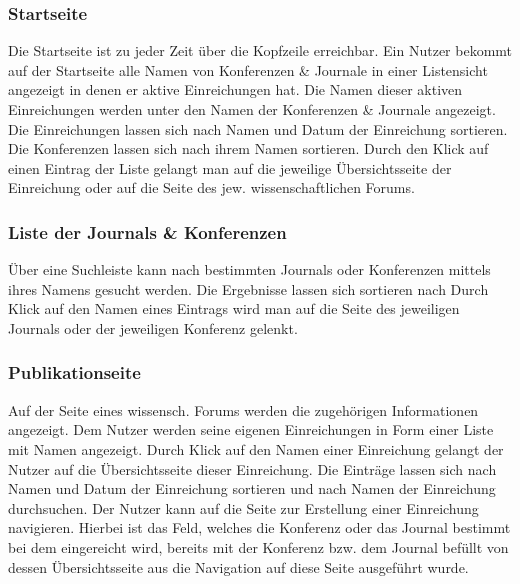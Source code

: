 \subsubsection{Startseite}
\begin{description}
    \XXitem{} Die Startseite ist zu jeder Zeit über die Kopfzeile erreichbar.
     Ein Nutzer bekommt auf der Startseite alle Namen von Konferenzen
    \& Journale in einer Listensicht angezeigt in denen er aktive Einreichungen hat.
    Die Namen dieser aktiven Einreichungen werden unter den Namen der Konferenzen \& Journale angezeigt.
     Die Einreichungen lassen sich nach Namen und Datum
    der Einreichung sortieren. Die Konferenzen lassen sich nach ihrem Namen sortieren.
    \XXitem{} Durch den Klick auf einen Eintrag der Liste gelangt man auf die jeweilige Übersichtsseite
    der Einreichung oder auf die Seite des jew. wissenschaftlichen Forums.
\end{description}

\subsubsection{Liste der Journals \& Konferenzen}
\begin{description}
     Über eine Suchleiste kann nach bestimmten Journals oder Konferenzen mittels
    ihres Namens gesucht werden.
     Die Ergebnisse lassen sich sortieren nach %
     Durch Klick auf den Namen eines Eintrags wird man auf die Seite des
    jeweiligen Journals oder der jeweiligen Konferenz gelenkt.
\end{description}

\subsubsection{Publikationseite}
\begin{description}
     Auf der Seite eines wissensch. Forums werden die zugehörigen Informationen
    angezeigt. %
     Dem Nutzer werden seine eigenen Einreichungen in Form einer Liste mit Namen angezeigt.
     Durch Klick auf den Namen einer Einreichung gelangt der Nutzer auf die Übersichtsseite
    dieser Einreichung.
     Die Einträge lassen sich nach Namen und Datum
    der Einreichung sortieren und nach Namen der Einreichung durchsuchen. %
    \XXitem{} Der Nutzer kann auf die Seite zur Erstellung einer Einreichung navigieren. Hierbei ist
    das Feld, welches die Konferenz oder das Journal bestimmt bei dem eingereicht wird, bereits mit
    der Konferenz bzw. dem Journal befüllt von dessen Übersichtsseite aus die Navigation auf diese
    Seite ausgeführt wurde.
\end{description}


